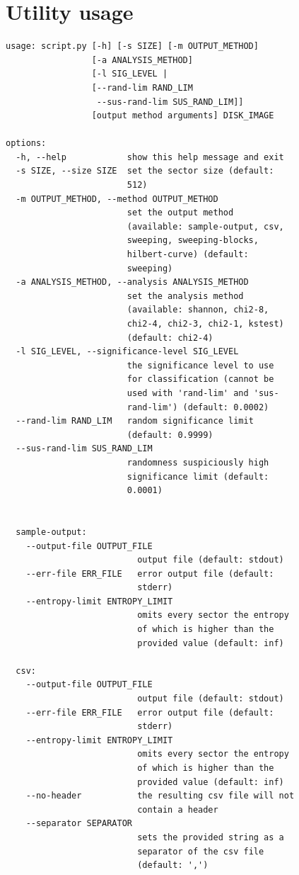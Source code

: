 \documentclass[
  digital, %
  color,   %
  oneside, %
  lof,     %
  nolot,     %
]{fithesis4}
\begin{document}
\makeatletter\thesis@blocks@clear\makeatother
\sloppy
\printbibliography

\appendix %
\chapter{Utility usage}
\label{chap:utility-usage}

\begin{verbatim}
usage: script.py [-h] [-s SIZE] [-m OUTPUT_METHOD] 
                 [-a ANALYSIS_METHOD] 
                 [-l SIG_LEVEL | 
                 [--rand-lim RAND_LIM 
                  --sus-rand-lim SUS_RAND_LIM]]
                 [output method arguments] DISK_IMAGE

options:
  -h, --help            show this help message and exit
  -s SIZE, --size SIZE  set the sector size (default:
                        512)
  -m OUTPUT_METHOD, --method OUTPUT_METHOD
                        set the output method
                        (available: sample-output, csv,
                        sweeping, sweeping-blocks,
                        hilbert-curve) (default:
                        sweeping)
  -a ANALYSIS_METHOD, --analysis ANALYSIS_METHOD
                        set the analysis method
                        (available: shannon, chi2-8,
                        chi2-4, chi2-3, chi2-1, kstest)
                        (default: chi2-4)
  -l SIG_LEVEL, --significance-level SIG_LEVEL
                        the significance level to use
                        for classification (cannot be
                        used with 'rand-lim' and 'sus-
                        rand-lim') (default: 0.0002)
  --rand-lim RAND_LIM   random significance limit
                        (default: 0.9999)
  --sus-rand-lim SUS_RAND_LIM
                        randomness suspiciously high
                        significance limit (default:
                        0.0001)


  sample-output:
    --output-file OUTPUT_FILE
                          output file (default: stdout)
    --err-file ERR_FILE   error output file (default:
                          stderr)
    --entropy-limit ENTROPY_LIMIT
                          omits every sector the entropy
                          of which is higher than the
                          provided value (default: inf)

  csv:
    --output-file OUTPUT_FILE
                          output file (default: stdout)
    --err-file ERR_FILE   error output file (default:
                          stderr)
    --entropy-limit ENTROPY_LIMIT
                          omits every sector the entropy
                          of which is higher than the
                          provided value (default: inf)
    --no-header           the resulting csv file will not
                          contain a header
    --separator SEPARATOR
                          sets the provided string as a
                          separator of the csv file
                          (default: ',')


\end{verbatim}
\end{document}
